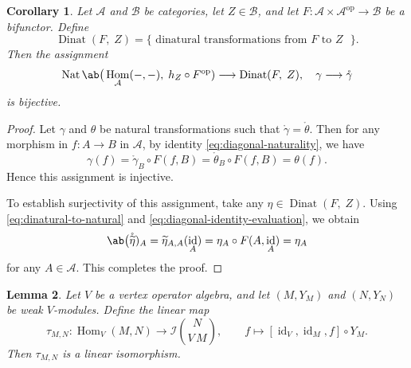\documentclass[12pt, english]{article}
\numberwithin{equation}{section}
\DeclareMathOperator{\Hom}{Hom}
\DeclareMathOperator{\id}{id}
\DeclareMathOperator{\opp}{op}
\DeclareMathOperator{\Nat}{Nat}
\DeclareMathOperator{\Dinat}{Dinat}
\theoremstyle{plain}
\newtheorem{lemma}{Lemma}[section]
\newtheorem{corollary}[lemma]{Corollary}
\theoremstyle{definition}
\theoremstyle{remark}
\begin{document}
	\begin{corollary} \label{cor:natural-dinatural-bijection}
		Let $\mathcal{A}$ and $\mathcal{B}$ be categories, let $Z \in \mathcal{B}$, and let $F\colon\mathcal{A} \times\mathcal{A}^{\opp} \to \mathcal{B} $ be a bifunctor.
		Define
		\[
		\Dinat(F, \; Z) = \{ \text{ dinatural transformations from $F$ to $Z$ } \}.
		\]
		Then the assignment
		\[
		\Nat \ab\big(\Hom_{\mathcal{A}}(-, -), \; h_Z\circ F^{\opp})
		\longrightarrow \Dinat(F, \; Z), \quad \gamma \longrightarrow \mathring{\gamma}
		\]
		is bijective.
	\end{corollary}
	
	\begin{proof}
		Let $\gamma$ and $\theta$ be natural transformations such that $\mathring{\gamma} = \mathring{\theta}$.
		Then for any morphism in $f\colon A \to B$ in $\mathcal{A}$, by identity \eqref{eq:diagonal-naturality}, we have
		\[
		\gamma(f) = \mathring{\gamma}_B\circ F(f, B) = \mathring{\theta}_B \circ F(f, B) = \theta(f).
		\]
		Hence this assignment is injective.
		
		To establish surjectivity of this assignment,
		take any $\eta \in \Dinat(F, \; Z).$
		Using \eqref{eq:dinatural-to-natural} and \eqref{eq:diagonal-identity-evaluation},  we obtain
		\[
		\ab\big(\mathring{\widetilde{\eta}})_A = \widetilde{\eta}_{A, A}(\id_A) = \eta_A \circ F(A, \id_A) = \eta_A
		\]
		for any $A \in \mathcal{A}$.
		This completes the proof.
	\end{proof}
	
	\begin{lemma} \label{lem:vertex-operator-intertwiners}
		Let $V$ be a vertex operator algebra, and let $(M, Y_M)$ and $(N, Y_N)$ be weak $V$-modules.
		Define the linear map
		\[
		\tau_{M, N}\colon \Hom_V(M, N) \longrightarrow \mathcal{I}\binom{N}{V\,M}, \qquad f \mapsto [\id_V, \id_M, f] \circ Y_M.
		\]
		Then $\tau_{M, N}$ is a linear isomorphism.
	\end{lemma}
	
\end{document}
